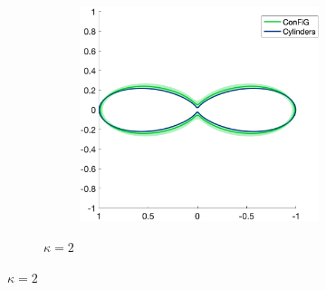 \begin{figure}
\begin{subfigure}[]{\textwidth}
\begin{subfigure}[]{0.3\textwidth}
  \end{subfigure}
  ~
  \begin{subfigure}[]{0.3\textwidth}
    \includegraphics[width=\textwidth]{figures/frf_experiment/fibres_prctiles_kappa_2_b_3000}
  \end{subfigure}
  \caption{$\kappa = 2$}
  \end{subfigure}


\end{figure}
